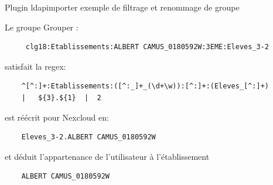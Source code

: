 \documentclass[aspectratio=169]{beamer}
\begin{document}
\begin{frame}[fragile]{Plugin ldapimporter} %
{exemple de filtrage et renommage de groupe}
\begin{list}{}{}
	\item {\tiny Le groupe Grouper :}
\begin{verbatim}
     clg18:Etablissements:ALBERT CAMUS_0180592W:3EME:Eleves_3-2
\end{verbatim}
\item {\tiny satisfait la regex:}
\begin{verbatim}
    ^[^:]+:Etablissements:([^:_]+_(\d+\w)):[^:]+:(Eleves_[^:]+) 
    |   ${3}.${1}  |  2
\end{verbatim}
\item {\tiny est réécrit pour Nexcloud en:}
\begin{verbatim}
    Eleves_3-2.ALBERT CAMUS_0180592W
\end{verbatim}
\item {\tiny et déduit l’appartenance de l'utilisateur à l'établissement}
\begin{verbatim}
    ALBERT CAMUS_0180592W
\end{verbatim}
\end{list}
\end{frame}
\end{document}
